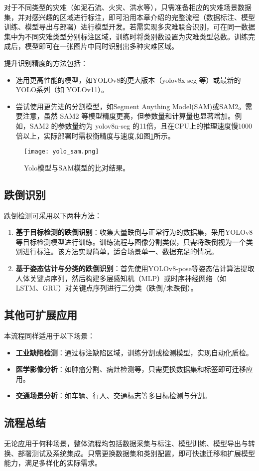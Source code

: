 对于不同类型的灾难（如泥石流、火灾、洪水等），只需准备相应的灾难场景数据集，并对感兴趣的区域进行标注，即可沿用本章介绍的完整流程（数据标注、模型训练、模型导出与部署）进行模型开发。若需实现多灾难联合识别，可在同一数据集中为不同灾难类型分别标注区域，训练时将类别数设置为灾难类型总数。训练完成后，模型即可在一张图片中同时识别出多种灾难区域。

提升识别精度的方法包括：
\begin{itemize}
    \item 选用更高性能的模型，如YOLOv8的更大版本（yolov8x-seg 等）或最新的YOLO系列（如 YOLOv11）。
    \item 尝试使用更先进的分割模型，如Segment Anything Model(SAM)或SAM2。需要注意，虽然 SAM2 等模型精度更高，但参数量和计算量也显著增加。例如，SAM2 的参数量约为 yolov8n-seg 的11倍，且在CPU上的推理速度慢1000倍以上，实际部署时需权衡精度与速度,如图\ref{fig:yolo_sam}所示。
\end{itemize}
\begin{figure}[H]  %
    \centering  %
    \texttt{[image: yolo\_sam.png]}  %
    \caption{Yolo模型与SAM模型的比对结果。}  %
    \label{fig:yolo_sam}
\end{figure}

\subsection{跌倒识别}

跌倒检测可采用以下两种方法：

\begin{enumerate}
    \item \textbf{基于目标检测的跌倒识别}：收集大量跌倒与正常行为的数据集，采用YOLOv8等目标检测模型进行训练。训练流程与图像分割类似，只需将跌倒视为一个类别进行标注。该方法实现简单，适合场景单一、数据充足的情况。
    \item \textbf{基于姿态估计与分类的跌倒识别}：首先使用YOLOv8-pose等姿态估计算法提取人体关键点序列，然后构建多层感知机（MLP）或时序神经网络（如 LSTM、GRU）对关键点序列进行二分类（跌倒/未跌倒）。
\end{enumerate}

\subsection{其他可扩展应用}

本流程同样适用于以下场景：
\begin{itemize}
    \item \textbf{工业缺陷检测}：通过标注缺陷区域，训练分割或检测模型，实现自动化质检。
    \item \textbf{医学影像分析}：如肿瘤分割、病灶检测等，只需更换数据集和标签即可迁移应用。
    \item \textbf{交通场景分析}：如车辆、行人、交通标志等多目标检测与分割。
\end{itemize}

\subsection{流程总结}

无论应用于何种场景，整体流程均包括数据采集与标注、模型训练、模型导出与转换、部署测试及系统集成。只需更换数据集和类别配置，即可快速迁移和扩展模型能力，满足多样化的实际需求。